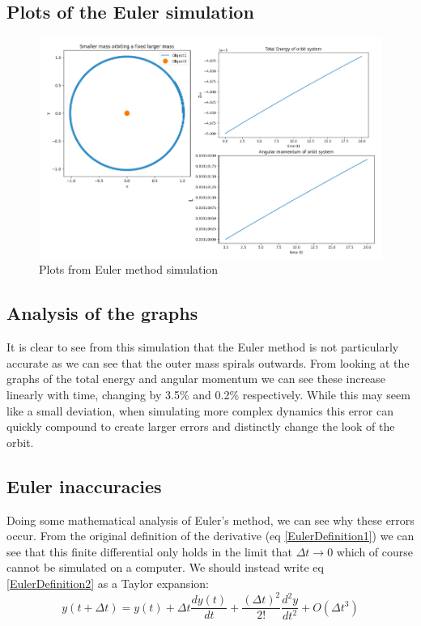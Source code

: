 \documentclass[11pt]{article}
\begin{document}
\subsection{Plots of the Euler simulation}
\begin{figure}[!ht]
\centerline{\includegraphics[scale=0.5]{Pictures/EulerGraph.png}}
\caption{Plots from Euler method simulation}
\label{EulerGraph}
\end{figure}



\subsection{Analysis of the graphs}

It is clear to see from this simulation that the Euler method is not particularly accurate as we can see that the outer mass spirals outwards. From looking at the graphs of the total energy and angular momentum we can see these increase linearly with time, changing by 3.5\% and 0.2\% respectively. While this may seem like a small deviation, when simulating more complex dynamics this error can quickly compound to create larger errors and distinctly change the look of the orbit.

\subsection{Euler inaccuracies}

Doing some mathematical analysis of Euler's method, we can see why these errors occur. From the original definition of the derivative (eq \ref{EulerDefinition1}) we can see that this finite differential only holds in the limit that $\Delta t \rightarrow 0$ which of course cannot be simulated on a computer. 
\smallskip
We should instead write eq \ref{EulerDefinition2} as a Taylor expansion:
\begin{equation}
y(t + \Delta t) = y(t) + \Delta t \frac{dy(t)}{dt} + \frac{(\Delta t)^2}{2!} \frac{d^2y}{dt^2} + O(\Delta t^3)
\label{Taylor}
\end{equation}
\end{document}
